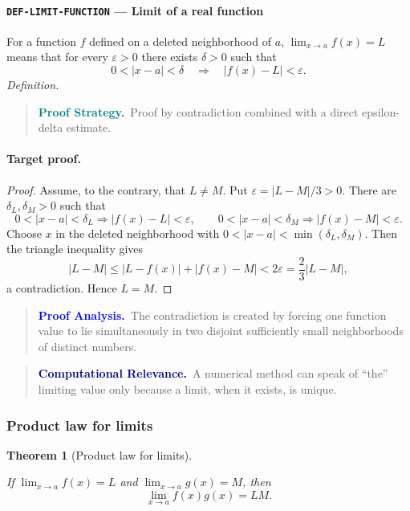 \documentclass[10pt]{article}
\newcommand{\pidraw}[1]{\begingroup\urlstyle{tt}\nolinkurl{#1}\endgroup}
\newtheorem{theorem}{Theorem}[section]
\theoremstyle{definition}
\theoremstyle{remark}
\newenvironment{proofstrategy}
{\begin{quote}\small\noindent\textbf{\textcolor{teal}{Proof Strategy.}}\ }
{\end{quote}}
\newenvironment{proofanalysis}
{\begin{quote}\small\noindent\textbf{\textcolor{blue}{Proof Analysis.}}\ }
{\end{quote}}
\newenvironment{computationalrelevance}
{\begin{quote}\small\noindent\textbf{\textcolor{navy}{Computational Relevance.}}\ }
{\end{quote}}
\begin{document}
\paragraph{\pidraw{DEF-LIMIT-FUNCTION} --- Limit of a real function}
For a function $f$ defined on a deleted neighborhood of $a$, $\lim_{x\to a}f(x)=L$ means that for every $\varepsilon>0$ there exists $\delta>0$ such that
\[
0<|x-a|<\delta\quad\Longrightarrow\quad |f(x)-L|<\varepsilon.
\]
\textit{Definition.}

\begin{proofstrategy}Proof by contradiction combined with a direct epsilon-delta estimate.\end{proofstrategy}

\paragraph{Target proof.}

\begin{proof}

Assume, to the contrary, that $L\ne M$. Put $\varepsilon=|L-M|/3>0$.
There are $\delta_L,\delta_M>0$ such that
\[
0<|x-a|<\delta_L\Rightarrow |f(x)-L|<\varepsilon,
\qquad
0<|x-a|<\delta_M\Rightarrow |f(x)-M|<\varepsilon.
\]
Choose $x$ in the deleted neighborhood with
$0<|x-a|<\min(\delta_L,\delta_M)$. Then the triangle inequality gives
\[
|L-M|\le |L-f(x)|+|f(x)-M|<2\varepsilon=\frac23|L-M|,
\]
a contradiction. Hence $L=M$.

\end{proof}

\begin{proofanalysis}The contradiction is created by forcing one function value to lie simultaneously in two disjoint sufficiently small neighborhoods of distinct numbers.\end{proofanalysis}

\begin{computationalrelevance}A numerical method can speak of ``the'' limiting value only because a limit, when it exists, is unique.\end{computationalrelevance}

\subsubsection{Product law for limits}

\begin{theorem}[Product law for limits]\label{prf:THM-LIMIT-PRODUCT}

If $\lim_{x\to a}f(x)=L$ and $\lim_{x\to a}g(x)=M$, then
\[
\lim_{x\to a}f(x)g(x)=LM.
\]

\end{theorem}
\end{document}

